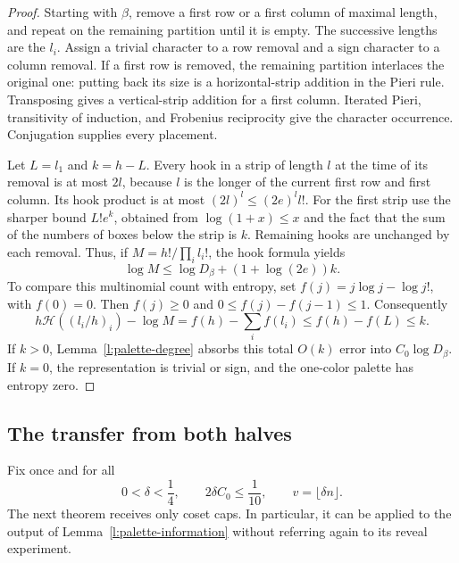 \begin{proof}
Starting with $\beta$, remove a first row or a first column of maximal
length, and repeat on the remaining partition until it is empty.  The
successive lengths are the $l_i$.  Assign a trivial character to a row
removal and a sign character to a column removal.  If a first row is
removed, the remaining partition interlaces the original one: putting
back its size is a horizontal-strip addition in the Pieri rule.
Transposing gives a vertical-strip addition for a first column.
Iterated Pieri, transitivity of induction, and Frobenius reciprocity
give the character occurrence.  Conjugation supplies every placement.

Let $L=l_1$ and $k=h-L$.  Every hook in a strip of length $l$ at the
time of its removal is at most $2l$, because $l$ is the longer of the
current first row and first column.  Its hook product is at most
$(2l)^l\le(2e)^l l!$.  For the first strip use the sharper bound
$L!e^k$, obtained from $\log(1+x)\le x$ and the fact that the
sum of the numbers of boxes below the strip is $k$.
Remaining hooks are unchanged by each removal.  Thus, if
$M=h!/\prod_i l_i!$, the hook formula yields
\[
 \log M\le\log D_\beta+(1+\log(2e))k.
\]
To compare this multinomial count with entropy, set
$f(j)=j\log j-\log j!$, with $f(0)=0$.  Then $f(j)\ge0$ and
$0\le f(j)-f(j-1)\le1$.  Consequently
\[
 h\mathcal H((l_i/h)_i)-\log M
 =f(h)-\sum_i f(l_i)\le f(h)-f(L)\le k.
\]
If $k>0$, Lemma~\ref{l:palette-degree} absorbs this total $O(k)$
error into $C_0\log D_\beta$.  If $k=0$, the representation is
trivial or sign, and the one-color palette has entropy zero.
\end{proof}

\subsection{The transfer from both halves}

Fix once and for all
\begin{equation}
 0<\delta<\frac14,\qquad 2\delta C_0\le\frac1{10},
 \qquad v=\lfloor\delta n\rfloor.
 \label{l:palette-delta}
\end{equation}
The next theorem receives only coset caps.  In particular, it can be
applied to the output of Lemma~\ref{l:palette-information} without
referring again to its reveal experiment.

